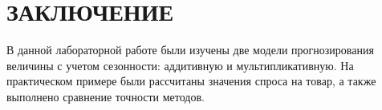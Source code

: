 \section*{ЗАКЛЮЧЕНИЕ}

В данной лабораторной работе были изучены две модели прогнозирования
величины с учетом сезонности: аддитивную и мультипликативную.
На практическом примере были рассчитаны значения спроса на товар,
а также выполнено сравнение точности методов.
